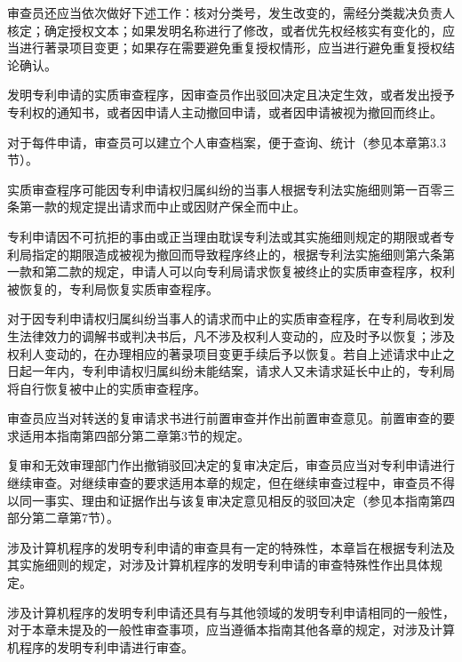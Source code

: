 审查员还应当依次做好下述工作：核对分类号，发生改变的，需经分类裁决负责人核定；确定授权文本；如果发明名称进行了修改，或者优先权经核实有变化的，应当进行著录项目变更；如果存在需要避免重复授权情形，应当进行避免重复授权结论确认。

发明专利申请的实质审查程序，因审查员作出驳回决定且决定生效，或者发出授予专利权的通知书，或者因申请人主动撤回申请，或者因申请被视为撤回而终止。

对于每件申请，审查员可以建立个人审查档案，便于查询、统计（参见本章第3.3节）。

实质审查程序可能因专利申请权归属纠纷的当事人根据专利法实施细则第一百零三条第一款的规定提出请求而中止或因财产保全而中止。

专利申请因不可抗拒的事由或正当理由耽误专利法或其实施细则规定的期限或者专利局指定的期限造成被视为撤回而导致程序终止的，根据专利法实施细则第六条第一款和第二款的规定，申请人可以向专利局请求恢复被终止的实质审查程序，权利被恢复的，专利局恢复实质审查程序。

对于因专利申请权归属纠纷当事人的请求而中止的实质审查程序，在专利局收到发生法律效力的调解书或判决书后，凡不涉及权利人变动的，应及时予以恢复；涉及权利人变动的，在办理相应的著录项目变更手续后予以恢复。若自上述请求中止之日起一年内，专利申请权归属纠纷未能结案，请求人又未请求延长中止的，专利局将自行恢复被中止的实质审查程序。

审查员应当对转送的复审请求书进行前置审查并作出前置审查意见。前置审查的要求适用本指南第四部分第二章第3节的规定。

复审和无效审理部门作出撤销驳回决定的复审决定后，审查员应当对专利申请进行继续审查。对继续审查的要求适用本章的规定，但在继续审查过程中，审查员不得以同一事实、理由和证据作出与该复审决定意见相反的驳回决定（参见本指南第四部分第二章第7节）。

涉及计算机程序的发明专利申请的审查具有一定的特殊性，本章旨在根据专利法及其实施细则的规定，对涉及计算机程序的发明专利申请的审查特殊性作出具体规定。

涉及计算机程序的发明专利申请还具有与其他领域的发明专利申请相同的一般性，对于本章未提及的一般性审查事项，应当遵循本指南其他各章的规定，对涉及计算机程序的发明专利申请进行审查。

